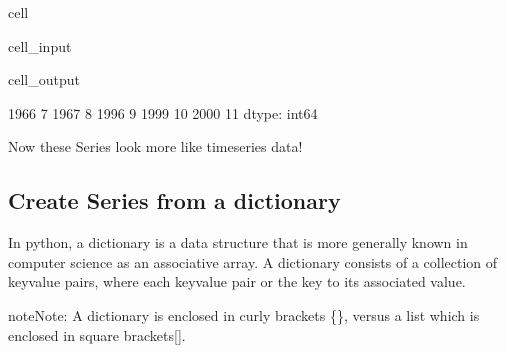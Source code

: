 \documentclass[letterpaper,10pt,english]{jupyterBook}
\begin{document}
\begin{sphinxuseclass}{cell}\begin{sphinxVerbatimInput}

\begin{sphinxuseclass}{cell_input}
\begin{sphinxVerbatim}[commandchars=\\\{\}]
\PYG{p}{[}\PYG{p}{]}
\end{sphinxVerbatim}

\end{sphinxuseclass}\end{sphinxVerbatimInput}
\begin{sphinxVerbatimOutput}

\begin{sphinxuseclass}{cell_output}
\begin{sphinxVerbatim}[commandchars=\\\{\}]
1966     7
1967     8
1996     9
1999    10
2000    11
dtype: int64
\end{sphinxVerbatim}

\end{sphinxuseclass}\end{sphinxVerbatimOutput}

\end{sphinxuseclass}
\sphinxAtStartPar
Now these Series look more like time\sphinxhyphen{}series data!


\subsection{Create Series from a dictionary}
\label{\detokenize{content/04_PythonEssentials/PythonPandasDataframes:create-series-from-a-dictionary}}
\sphinxAtStartPar
In python, a dictionary is a data structure that is more generally known in computer science as an associative array. A dictionary consists of a collection of key\sphinxhyphen{}value pairs, where each key\sphinxhyphen{}value pair  or  the key to its associated value.

\begin{sphinxadmonition}{note}{Note:}
\sphinxAtStartPar
A dictionary is enclosed in curly brackets \{\}, versus a list which is enclosed in square brackets{[}{]}.
\end{sphinxadmonition}
\end{document}
